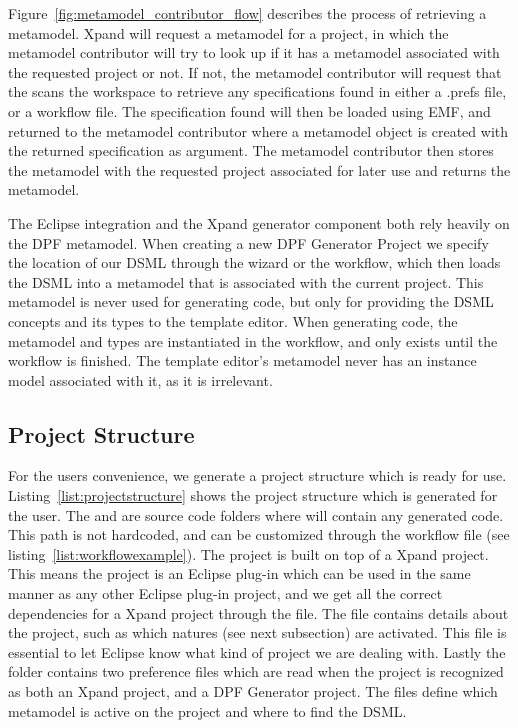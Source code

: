 Figure~\ref{fig:metamodel_contributor_flow} describes the process of retrieving a metamodel. Xpand will request a metamodel for a project, in which the metamodel contributor will try to look up if it has a metamodel associated with the requested project or not. If not, the metamodel contributor will request that the  scans the workspace to retrieve any specifications found in either a .prefs file, or a workflow file. The specification found will then be loaded using EMF, and returned to the metamodel contributor where a metamodel object is created with the returned specification as argument. The metamodel contributor then stores the metamodel with the requested project associated for later use and returns the metamodel.

The Eclipse integration and the Xpand generator component both rely heavily on the DPF metamodel. When creating a new DPF Generator Project we specify the location of our DSML through the wizard or the workflow, which then loads the DSML into a metamodel that is associated with the current project. This metamodel is never used for generating code, but only for providing the DSML concepts and its types to the template editor. When generating code, the metamodel and types are instantiated in the workflow, and only exists until the workflow is finished. The template editor's metamodel never has an instance model associated with it, as it is irrelevant.

\subsection{Project Structure}\label{subsec:project_structure}
For the users convenience, we generate a project structure which is ready for use.  Listing~\ref{list:projectstructure} shows the project structure which is generated for the user. The  and  are source code folders where  will contain any generated code. This path is not hardcoded, and can be customized through the workflow file (see listing~\ref{list:workflowexample}). The project is built on top of a Xpand project. This means the project is an Eclipse plug-in which can be used in the same manner as any other Eclipse plug-in project, and we get all the correct dependencies for a Xpand project through the  file. The  file contains details about the project, such as which natures (see next subsection) are activated. This file is essential to let Eclipse know what kind of project we are dealing with. Lastly the  folder contains two preference files which are read when the project is recognized as both an Xpand project, and a DPF Generator project. The files define which metamodel is active on the project and where to find the DSML.

